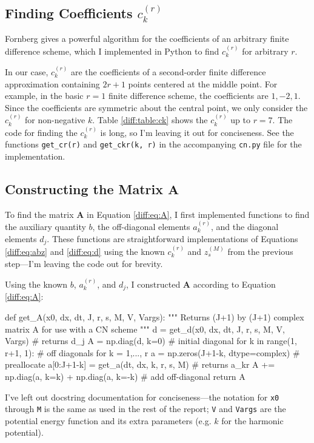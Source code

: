 \documentclass[11pt, a4paper]{article}
\newcommand{\mat}[1]{\mathbf{#1}}
\begin{document}
\subsection{Finding Coefficients $ c_{k}^{(r)} $}
Fornberg \cite{fornberg} gives a powerful algorithm for the coefficients of an arbitrary finite difference scheme, which I implemented in Python to find $ c_{k}^{(r)} $ for arbitrary $ r $.

In our case, $ c_{k}^{(r)} $ are the coefficients of a second-order finite difference approximation containing $ 2r + 1 $ points centered at the middle point. For example, in the basic $ r = 1 $ finite difference scheme, the coefficients are $ 1, -2, 1 $. Since the coefficients are symmetric about the central point, we only consider the $ c_{k}^{(r)} $ for non-negative $ k $. Table \ref{diff:table:ck} shows the $ c_{k}^{(r)} $ up to $ r = 7 $. The code for finding the $ c_{k}^{(r)} $ is long, so I'm leaving it out for conciseness. See the functions \texttt{get\_cr(r)} and \texttt{get\_ckr(k, r)} in the accompanying \texttt{cn.py} file for the implementation.

\subsection{Constructing the Matrix $ \mat{A} $}
To find the matrix $ \mat{A} $ in Equation \ref{diff:eq:A}, I first implemented functions to find the auxiliary quantity $ b $, the off-diagonal elements $ a_{k}^{(r)} $, and the diagonal elements $ d_{j} $. These functions are straightforward implementations of Equations \ref{diff:eq:abz} and \ref{diff:eq:d} using the known $ c_{k}^{(r)} $ and $ z_{s}^{(M)} $ from the previous step---I'm leaving the code out for brevity. 

Using the known  $ b $, $ a_{k}^{(r)} $, and $ d_{j} $, I constructed $ \mat{A} $ according to Equation \ref{diff:eq:A}:
\begin{python}
def get_A(x0, dx, dt, J, r, s, M, V, Vargs):
    """ Returns (J+1) by (J+1) complex matrix A for use with a CN scheme """
    d = get_d(x0, dx, dt, J, r, s, M, V, Vargs)  # returns d_j
    A = np.diag(d, k=0)  # initial diagonal
    for k in range(1, r+1, 1):  # off diagonals for k = 1,..., r
        a = np.zeros(J+1-k, dtype=complex)  # preallocate
        a[0:J+1-k] = get_a(dt, dx, k, r, s, M)  # returns a_kr
        A += np.diag(a, k=k) + np.diag(a, k=-k)  # add off-diagonal
    return A
\end{python}
I've left out docstring documentation for conciseness---the notation for \texttt{x0} through \texttt{M} is the same as used in the rest of the report; \texttt{V} and \texttt{Vargs} are the potential energy function and its extra parameters (e.g. $ k $ for the harmonic potential).
\end{document}
